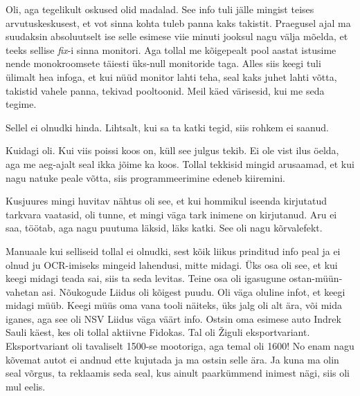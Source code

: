 Oli, aga tegelikult oskused olid madalad.  See info tuli  jälle mingist teises 
arvutuskeskusest, et vot sinna kohta tuleb panna kaks takistit. Praegusel ajal 
ma suudaksin absoluutselt ise selle esimese viie minuti jooksul nagu välja 
mõelda, et teeks sellise \emph{fix}-i sinna monitori. Aga tollal me kõigepealt 
pool aastat istusime nende monokroomsete täiesti üks-null monitoride taga. 
Alles siis keegi tuli ülimalt hea infoga, et kui nüüd monitor lahti teha, seal 
kaks juhet lahti võtta, takistid vahele panna, tekivad pooltoonid. Meil käed 
värisesid, kui me seda tegime. 


Sellel ei olnudki hinda. Lihtsalt, kui sa ta katki tegid, siis rohkem ei saanud.


Kuidagi oli. Kui viis poissi koos on, küll see julgus tekib. Ei ole vist ilus 
öelda, aga me aeg-ajalt seal ikka jõime ka koos. Tollal tekkisid mingid 
arusaamad, et kui nagu natuke peale võtta, siis programmeerimine edeneb 
kiiremini. 

Kusjuures mingi huvitav nähtus oli see, et kui hommikul iseenda kirjutatud 
tarkvara vaatasid, oli tunne, et mingi väga tark inimene on kirjutanud. Aru ei 
saa, töötab, aga nagu puutuma läksid, läks katki. See oli nagu  kõrvalefekt. 


Manuaale kui selliseid tollal ei olnudki, sest kõik liikus prinditud info peal 
ja ei olnud ju OCR-imiseks mingeid lahendusi, mitte midagi. Üks osa oli see, et 
kui keegi midagi teada sai, siis ta seda levitas. Teine osa oli igasugune 
ostan-müün-vahetan asi. Nõukogude Liidus oli kõigest puudu. Oli väga oluline 
infot, et keegi midagi müüb. Keegi müüs oma vana tooli näiteks, üks jalg oli 
alt ära, või mida iganes, aga see oli NSV Liidus väga väärt info. Ostsin oma 
esimese auto  Indrek Sauli käest, kes oli tollal 
aktiivne Fidokas. Tal oli  Žiguli eksportvariant. Eksportvariant oli tavaliselt 
1500-se mootoriga, aga temal oli 1600! No enam nagu kõvemat autot ei andnud 
ette kujutada ja ma ostsin selle ära. Ja kuna ma olin seal võrgus, ta reklaamis 
seda seal, kus ainult paarkümmend inimest nägi, siis oli mul eelis.


